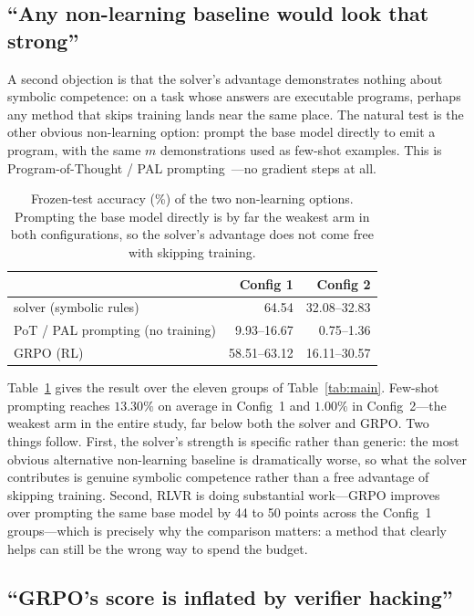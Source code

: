 \subsection{``Any non-learning baseline would look that strong''}

A second objection is that the solver's advantage demonstrates nothing about
symbolic competence: on a task whose answers are executable programs, perhaps
any method that skips training lands near the same place. The natural test is
the other obvious non-learning option: prompt the base model directly to emit a
program, with the same $m$ demonstrations used as few-shot examples. This is
Program-of-Thought / PAL prompting~\cite{pot2022,pal2023}---no gradient steps
at all.

\begin{table}[t]
\centering
\small
\setlength{\tabcolsep}{4pt}
\caption{Frozen-test accuracy (\%) of the two non-learning options. Prompting
the base model directly is by far the weakest arm in both configurations, so
the solver's advantage does not come free with skipping training.}
\label{tab:pot}
\begin{tabular}{lrr}
\toprule
& Config 1 & Config 2 \\
\midrule
solver (symbolic rules)          & 64.54 & 32.08--32.83 \\
PoT / PAL prompting (no training) & 9.93--16.67 & 0.75--1.36 \\
\midrule
GRPO (RL)                        & 58.51--63.12 & 16.11--30.57 \\
\bottomrule
\end{tabular}
\end{table}

Table~\ref{tab:pot} gives the result over the eleven groups of
Table~\ref{tab:main}. Few-shot prompting reaches $13.30\%$ on average in
Config~1 and $1.00\%$ in Config~2---the weakest arm in the entire study, far
below both the solver and GRPO. Two things follow. First, the solver's
strength is specific rather than generic: the most obvious alternative
non-learning baseline is dramatically worse, so what the solver contributes is
genuine symbolic competence rather than a free advantage of skipping training. Second, RLVR is doing substantial work---GRPO improves over
prompting the same base model by 44 to 50 points across the Config~1
groups---which is precisely why the comparison matters: a method that clearly
helps can still be the wrong way to spend the budget.

\subsection{``GRPO's score is inflated by verifier hacking''}

